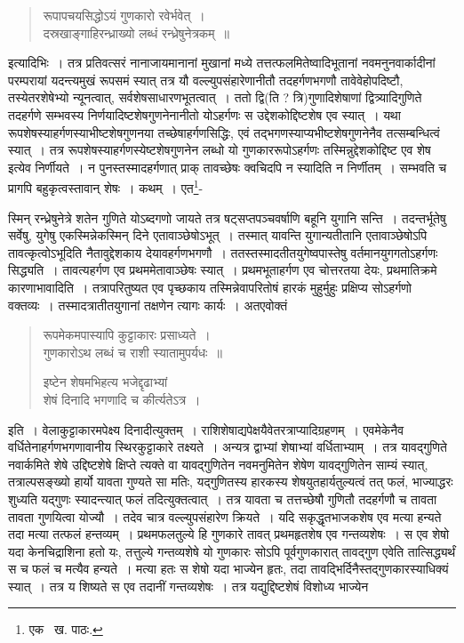 \documentclass[11pt, openany]{book}
\begin{document}
\begin{quote}
{\qt रूपापचयसिद्धोऽयं गुणकारो रवेर्भवेत्~।\\
दस्रखाङ्गाहिरन्ध्राख्यो लब्धं रन्ध्रेषुनेत्रकम्~॥}
\end{quote}

\noindent इत्यादिभिः~। तत्र प्रतिवत्सरं नानाजायमानानां मुखानां मध्ये तत्तत्फलमितेष्वादिभूतानां नवमनुनवार्कादीनां परम्परायां यदन्त्यमुखं रूपसमं स्यात् तत्र यौ वल्ल्युपसंहारेणानीतौ तदहर्गणभगणौ तावेवेहोपदिष्टौ, तस्येतरशेषेभ्यो न्यूनत्वात्, सर्वशेषसाधारणभूतत्वात्~। ततो द्वि(ति ? त्रि)गुणादिशेषाणां द्वित्र्यादिगुणिते तदहर्गणे सम्भवस्य निर्णयादिष्टशेषगुणनेनानीतो योऽहर्गणः स उद्देशकोद्दिष्टशेष एव स्यात्~। यथा रूपशेषस्याहर्गणस्याभीष्टशेषगुणनया तच्छेषाहर्गणसिद्धिः, एवं तद्भगणस्याप्यभीष्टशेषगुणनेनैव तत्सम्बन्धित्वं स्यात्~। तत्र रूपशेषस्याहर्गणस्येष्टशेषगुणनेन लब्धो यो गुणकाररूपोऽहर्गणः तस्मिन्नुद्देशकोद्दिष्ट एव शेष इत्येव निर्णीयते~। न पुनस्तस्मादहर्गणात् प्राक् तावच्छेषः क्वचिदपि न स्यादिति न निर्णीतम्~। सम्भवति च प्रागपि बहुकृत्वस्तावान् शेषः~। कथम्~। एत\renewcommand{\thefootnote}{३}\footnote{एक \textendash\ ख. पाठः.}-

\newpage

\noindent स्मिन् रन्ध्रेषुनेत्रे शतेन गुणिते योऽब्दगणो जायते तत्र षट्सप्तपञ्चवर्षाणि बहूनि युगानि सन्ति~। तदन्तर्भूतेषु सर्वेषु, युगेषु एकस्मिन्नेकस्मिन् दिने एतावाञ्छेषोऽभूत्~। तस्मात् यावन्ति युगान्यतीतानि एतावाञ्छेषोऽपि तावत्कृत्वोऽभूदिति नैतावुद्देशकाय देयावहर्गणभगणौ~। ततस्तस्मादतीतयुगेष्वपास्तेषु वर्तमानयुगगतोऽहर्गणः सिद्ध्यति~। तावत्यहर्गण एव प्रथममेतावाञ्छेषः स्यात्~। प्रथमभूताहर्गण एव चोत्तरतया देयः, प्रथमातिक्रमे कारणाभावादिति~। तत्रापरितुष्यत एव पृच्छकाय तस्मिन्नेवापरितोषं हारकं मुहुर्मुहुः प्रक्षिप्य सोऽहर्गणो वक्तव्यः~। तस्मादत्रातीतयुगानां
तक्षणेन त्यागः कार्यः~। अतएवोक्तं\textendash

\begin{quote}
{\qt रूपमेकमपास्यापि कुट्टाकारः प्रसाध्यते~।\\
गुणकारोऽथ लब्धं च राशी स्यातामुपर्यधः~॥

इष्टेन शेषमभिहत्य भजेद्दृढाभ्यां\\
शेषं दिनादि भगणादि च कीर्त्यतेऽत्र~।}
\end{quote}

\noindent इति~। वेलाकुट्टाकारमपेक्ष्य दिनादीत्युक्तम्~। राशिशेषाद्यपेक्षयैवेतरत्राप्यादिग्रहणम्~। एवमेकेनैव वर्धितेनाहर्गणभगणावानीय स्थिरकुट्टाकारे तक्ष्यते~। अन्यत्र द्वाभ्यां शेषाभ्यां वर्धिताभ्याम्~। तत्र यावद्गुणिते नवार्कमिते शेषे उद्दिष्टशेषे क्षिप्ते त्यक्ते वा यावद्गुणितेन नवमनुमितेन शेषेण यावद्गुणितेन साम्यं स्यात्, तत्राल्पसङ्ख्यो हार्यो यावता गुण्यते सा मतिः, यद्गुणितस्य हारकस्य शेषयुतहार्यतुल्यत्वं तत् फलं, {\qt भाज्याद्धरः शुध्यति यद्गुणः स्यादन्त्यात् फलं तदि}त्युक्तत्वात्~। तत्र यावता च तत्तच्छेषौ गुणितौ तदहर्गणौ च तावता तावता गुणयित्वा योज्यौ~। तदेव चात्र वल्ल्युपसंहारेण क्रियते~। यदि सकृद्धृतभाजकशेष एव मत्या हन्यते तदा मत्या तत्फलं हन्तव्यम्~। प्रथमफलतुल्ये हि गुणकारे तावत् प्रथमहृतशेष एव गन्तव्यशेषः~। स एव शेषो यदा केनचिद्राशिना हतो यः, तत्तुल्ये गन्तव्यशेषे यो गुणकारः सोऽपि पूर्वगुणकारात् तावद्गुण एवेति तात्सिद्ध्यर्थं स च फलं च मत्यैव हन्यते~। मत्या हतः स शेषो यदा भाज्येन हृतः, तदा तावद्भिर्दिनैस्तद्गुणकारस्याधिक्यं स्यात्~। तत्र य शिष्यते स एव तदानीं गन्तव्यशेषः~। तत्र यद्युद्दिष्टशेषं विशोध्य भाज्येन
\end{document}
